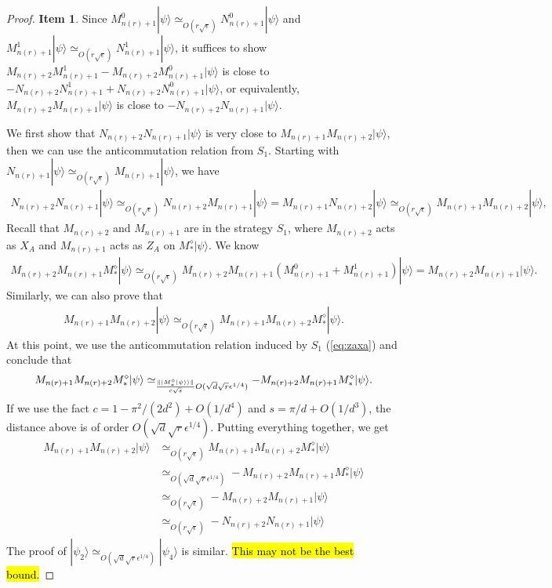 \documentclass[11pt,letterpaper]{article}
\newcommand{\ket}[1]{|#1\rangle}
\DeclarePairedDelimiter{\norm}{\lVert}{\rVert}
\newcommand{\1}{\mathbb{1}}
\newcommand{\nr}{n(r)}
\newcommand{\se}{\sqrt{\epsilon}}
\newcommand{\qe}{\epsilon^{1/4}}
\newcommand{\sd}{\sqrt{d}}
\newcommand{\sr}{\sqrt{r}}
\newcommand{\appd}[1]{\simeq_{#1}}
\theoremstyle{definition}
\begin{document}
\begin{proof}
	\textbf{Item 1}. 
	Since $M_{\nr+1}^0 \ket{\psi} \appd{O(r\se)} N_{\nr+1}^0 \ket{\psi}$ and $M_{\nr+1}^1 \ket{\psi} \appd{O(r\se)} N_{\nr+1}^1 \ket{\psi}$,
	it suffices to show
	$M_{\nr+2}M_{\nr+1}^1 - M_{\nr+2}M_{\nr+1}^0 \ket{\psi}$ is close to $- N_{\nr+2}N_{\nr+1}^1+N_{\nr+2}N_{\nr+1}^0\ket{\psi}$,
	or equivalently,
	$M_{\nr+2}M_{\nr+1} \ket{\psi}$ is close to $-N_{\nr+2}N_{\nr+1} \ket{\psi}$.

	
	We first show that $N_{\nr+2}N_{\nr+1} \ket{\psi}$ is very close to $M_{\nr+1}M_{\nr+2}\ket{\psi}$, then we 
	can use the anticommutation relation from $S_1$.
	Starting with $N_{\nr+1} \ket{\psi} \appd{O(r\se)} M_{\nr+1}\ket{\psi}$, we have
	\begin{align}
		N_{\nr+2}N_{\nr+1}\ket{\psi} \appd{O(r\se)} N_{\nr+2}M_{\nr+1}\ket{\psi} =M_{\nr+1} N_{\nr+2}\ket{\psi} \appd{O(r\se)} M_{\nr+1}M_{\nr+2}\ket{\psi},
	\end{align}
	Recall that $M_{\nr+2}$ and $M_{\nr+1}$ are in the strategy $S_1$, where $M_{\nr+2}$ acts as $X_A$ 
	and $M_{\nr+1}$ acts as $Z_A$ on $M_\ast^\diamond \ket{\psi}$. We know 
	\begin{align}
		M_{\nr+2}M_{\nr+1} M_\ast^\diamond \ket{\psi} \appd{O(r\se)} M_{\nr+2}M_{\nr+1}(M_{\nr+1}^0 + M_{\nr+1}^1)\ket{\psi} = M_{\nr+2}M_{\nr+1}\ket{\psi}.
	\end{align}
	Similarly, we can also prove that 
	\begin{align}
		M_{\nr+1}M_{\nr+2} \ket{\psi} \appd{O( r\se)} M_{\nr+1}M_{\nr+2} M_\ast^\diamond \ket{\psi}.
	\end{align}
	At this point, we use the anticommutation relation induced by $S_1$ (\cref{eq:zaxa}) and conclude that 
	\begin{align}
		M_{\nr+1}M_{\nr+2} M_\ast^\diamond \ket{\psi} \appd{\frac{\norm{\ket{M_\ast^\diamond\ket{\psi}}}}{c\sqrt{s}}O(\sd\sr\qe)} -M_{\nr+2}M_{\nr+1} M_\ast^\diamond \ket{\psi}.
	\end{align}
	If we use the fact $c = 1 - \pi^2/(2d^2) + O(1/d^4)$ and $s = \pi/d + O(1/d^3)$, the distance above is of order $O(\sd \sr \qe)$.
	Putting everything together, we get 
	\begin{align}
		M_{\nr+1}M_{\nr+2} \ket{\psi} &\appd{O( r\se)} M_{\nr+1}M_{\nr+2} M_\ast^\diamond \ket{\psi}\\
							&\appd{O(\sd \sr \qe)} -M_{\nr+2}M_{\nr+1} M_\ast^\diamond \ket{\psi}\\
							&\appd{O( r\se)} -M_{\nr+2}M_{\nr+1} \ket{\psi} \\
							&\appd{O(r \se)}-N_{\nr+2}N_{\nr+1}\ket{\psi}
	\end{align}
	The proof of $\ket{\psi_2} \appd{O(\sd \sr \qe)} \ket{\psi_4}$ is similar.
	\hl{This may not be the best bound.}
	

\end{proof}
\end{document}
